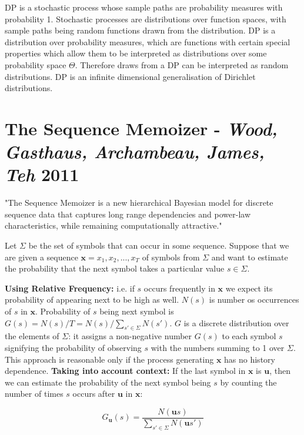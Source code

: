 DP is a stochastic process whose sample paths are probability measures with probability 1. Stochastic processes are distributions over function spaces, with sample paths being random functions drawn from the distribution. DP is a distribution over probability measures, which are functions with certain special properties which allow them to be interpreted as distributions over some probability space $\Theta$. Therefore draws from a DP can be interpreted as random distributions. DP is an infinite dimensional generalisation of Dirichlet distributions.

\section{The Sequence Memoizer - \textit{Wood, Gasthaus, Archambeau, James, Teh} 2011} \cite{wood2011sequence}

"The Sequence Memoizer is a new hierarchical Bayesian model for discrete sequence data that captures long range dependencies and power-law characteristics, while remaining computationally attractive."

Let $\Sigma$ be the set of symbols that can occur in some sequence. Suppose that we are given a sequence $\boldsymbol{x}=x_{1}, x_{2}, ..., x_{T}$ of symbols from $\Sigma$ and want to estimate the probability that the next symbol takes a particular value $s \in \Sigma$.

\textbf{Using Relative Frequency:} i.e. if $s$ occurs frequently in $\boldsymbol{x}$ we expect its probability of appearing next to be high as well. $N(s)$ is number os occurrences of $s$ in $\boldsymbol{x}$. Probability of $s$ being next symbol is $G(s)=N(s)/T=N(s)/\sum_{s' \in \Sigma}N(s')$. $G$ is a discrete distribution over the elements of $\Sigma$: it assigns a non-negative number $G(s)$ to each symbol $s$ signifying the probability of observing $s$ with the numbers summing to 1 over $\Sigma$. This approach is reasonable only if the process generating $\boldsymbol{x}$ has no history dependence. 
\textbf{Taking into account context:} If the last symbol in $\boldsymbol{x}$ is $\boldsymbol{u}$, then we can estimate the probability of the next symbol being $s$ by counting the number of times $s$ occurs after $\boldsymbol{u}$ in $\boldsymbol{x}$:

\begin{equation}
G_{\boldsymbol{u}}(s)=\frac{N(\boldsymbol{u}s)}{\sum_{s' \in \Sigma}N(\boldsymbol{u}s')}
\label{eq:seqMemRelativeFreqContext}
\end{equation}

